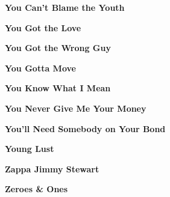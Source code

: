 \begin{center}\textbf{You Can't Blame the Youth}\end{center}
\newline
\vspace{10pt} 
\begin{center}\textbf{You Got the Love}\end{center}
\newline
\vspace{10pt} 
\begin{center}\textbf{You Got the Wrong Guy}\end{center}
\newline
\vspace{10pt} 
\begin{center}\textbf{You Gotta Move}\end{center}
\newline
\vspace{10pt} 
\begin{center}\textbf{You Know What I Mean}\end{center}
\newline
\vspace{10pt} 
\begin{center}\textbf{You Never Give Me Your Money}\end{center}
\newline
\vspace{10pt} 
\begin{center}\textbf{You'll Need Somebody on Your Bond}\end{center}
\newline
\vspace{10pt} 
\begin{center}\textbf{Young Lust}\end{center}
\newline
\vspace{10pt} 
\begin{center}\textbf{Zappa Jimmy Stewart}\end{center}
\newline
\vspace{10pt} 
\begin{center}\textbf{Zeroes \& Ones}\end{center}
\newline
\vspace{10pt} 
